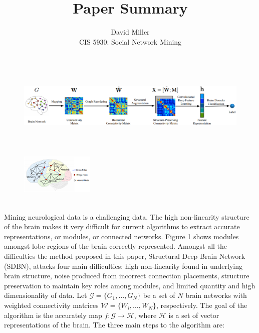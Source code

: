 \documentclass[12pt]{article}
\theoremstyle{remark}
\begin{document}
	
	\title{Paper Summary}
	\author{David Miller \\ 
		CIS 5930: Social Network Mining} 
	
	\maketitle 
	
	\begin{figure}[H]{}
		\centering
		\vspace{-15pt}
		\hspace{-10pt}
		\includegraphics[height=3.25cm,width=1\textwidth]{fig1.eps}
		\caption{}
		\vspace{0pt}
	\end{figure} 
	
	\begin{figure}
		\vspace{-15pt}
		\hspace{-20pt}
		\includegraphics[height=3cm,width=0.31\textwidth]{fig2.eps}
		\caption{}
	\end{figure}
	
	Mining neurological data is a challenging data. The high non-linearity structure of the brain makes it very difficult for current algorithms to extract accurate representations, or modules, or connected networks. Figure 1 shows modules amongst lobe regions of the brain correctly represented. Amongst all the difficulties the method proposed in this paper, Structural Deep Brain Network (SDBN), attacks four main difficulties: high non-linearity found in underlying brain structure, noise produced from incorrect connection placements, structure preservation to maintain key roles among modules, and limited quantity and high dimensionality of data. Let $\mathcal{G} = \{G_1, \dots, G_N\}$ be a set of $N$ brain networks with weighted connectivity matrices $\mathcal{W} = \{W_i, \dots, W_N\}$, respectively. The goal of the algorithm is the accurately map $f:\mathcal{G} \rightarrow \mathcal{H}$, where $\mathcal{H}$ is a set of vector representations of the brain. The three main steps to the algorithm are:
	
\end{document}

